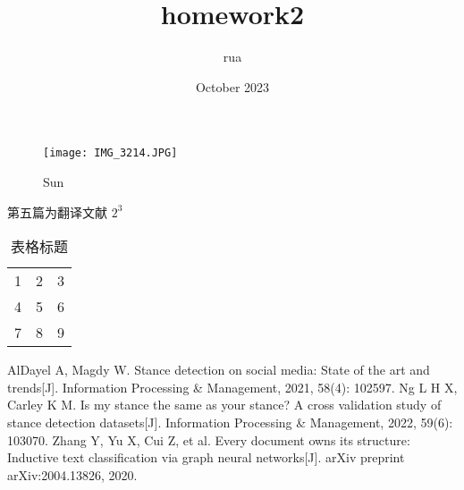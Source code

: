 \documentclass[UTF8]{ctexart}
\title{homework2}
\author{rua }
\date{October 2023}
\begin{document}
\maketitle
\begin{figure}
    \centering
    \texttt{[image: IMG\_3214.JPG]}
    \caption{Sun}
    \label{fig:enter-label}
\end{figure}
第五篇为翻译文献
$2^{3} $
\begin{table}[htbp]
    \centering
    \caption{表格标题}
    \begin{tabular}{ccc}
        1 & 2 & 3 \\
        4 & 5 & 6 \\
        7 & 8 & 9
    \end{tabular}
\end{table}
\begin{thebibliography}{99}  

AlDayel A, Magdy W. Stance detection on social media: State of the art and trends[J]. Information Processing \& Management, 2021, 58(4): 102597.
Ng L H X, Carley K M. Is my stance the same as your stance? A cross validation study of stance detection datasets[J]. Information Processing \& Management, 2022, 59(6): 103070.
Zhang Y, Yu X, Cui Z, et al. Every document owns its structure: Inductive text classification via graph neural networks[J]. arXiv preprint arXiv:2004.13826, 2020.

\end{thebibliography}
\end{document}
